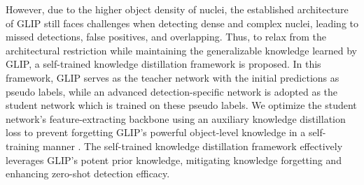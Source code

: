 \documentclass[journal,twoside,web]{ieeecolor}
\begin{document}
However, due to the higher object density of nuclei, the established architecture of GLIP still faces challenges when detecting dense and complex nuclei, leading to missed detections, false positives, and overlapping. Thus, to relax from the architectural restriction while maintaining the generalizable knowledge learned by GLIP, a self-trained knowledge distillation framework is proposed. In this framework, GLIP serves as the teacher network with the initial predictions as pseudo labels, while an advanced detection-specific network is adopted as the student network which is trained on these pseudo labels. We optimize the student network's feature-extracting backbone using an auxiliary knowledge distillation loss \cite{wang2021knowledge} to prevent forgetting GLIP's powerful object-level knowledge in a self-training manner \cite{dopido2013semisupervised}. The self-trained knowledge distillation framework effectively leverages GLIP's potent prior knowledge, mitigating knowledge forgetting \cite{chen2019catastrophic} and enhancing zero-shot detection efficacy.
\end{document}
